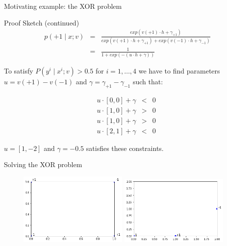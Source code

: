 \begin{frame}{Motivating example: the XOR problem}
\begin{block}{Proof Sketch (continued)}
\begin{eqnarray*}
p(+1 \mid x; v) &=& \frac{exp(v(+1) \cdot h  + \gamma_{+1})}{exp(v(+1) \cdot h  + \gamma_{+1}) + exp(v(-1) \cdot h + \gamma_{-1})} \\
&=& \frac{1}{1 + exp(-(u \cdot h + \gamma))}
\end{eqnarray*}

\pause
To satisfy $P(y^i \mid x^i; v) > 0.5$ for $i = 1,\ldots,4$
we have to find parameters $u = v(+1) - v(-1)$ and $\gamma = \gamma_{+1} - \gamma_{-1}$
such that:

\begin{eqnarray*}
u \cdot [0,0] + \gamma &<& 0 \\
u \cdot [1,0] + \gamma &>& 0 \\
u \cdot [1,0] + \gamma &>& 0 \\
u \cdot [2,1] + \gamma &<& 0 \end{eqnarray*}

$u = [1, -2]$ and $\gamma = -0.5$ satisfies these constraints.
\end{block}
\end{frame}

\begin{frame}{Solving the XOR problem}
\begin{figure}
   \includegraphics[width=0.475\textwidth]{figures/xorbefore.png}
   \hfill
   \includegraphics[width=0.475\textwidth]{figures/xorafter.png}
\end{figure}
\end{frame}




 
 
